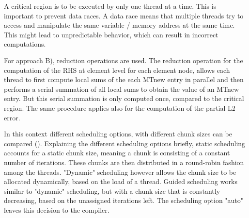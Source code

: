 A critical region is to be executed by only one thread at a time. This is important to prevent data races. A data race means that multiple threads try to access and manipulate the same variable / memory address at the same time. This might lead to unpredictable behavior, which can result in incorrect computations. 

For approach B), reduction operations are used. The reduction operation for the computation of the RHS at element level for each element node, allows each thread to first compute local sums of the each MTnew entry in parallel and then performs a serial summation of all local sums to obtain the value of an MTnew entry. But this serial summation is only computed once, compared to the critical region. The same procedure applies also for the computation of the partial L2 error. 

In this context different scheduling options, with different chunk sizes can be compared (). Explaining the different scheduling options briefly, static scheduling accounts for a static chunk size, meaning a chunk is consisting of a constant number of iterations. These chunks are then distributed in a round-robin fashion among the threads. "Dynamic" scheduling however allows the chunk size to be allocated dynamically, based on the load of a thread. Guided scheduling works similar to "dynamic" scheduling, but with a chunk size that is constantly decreasing, based on the unassigned iterations left. The scheduling option "auto" leaves this decision to the compiler.
\newpage

